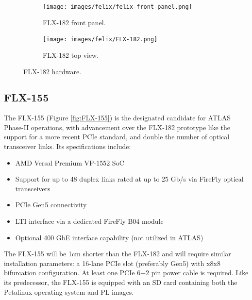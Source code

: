 \begin{figure}[H]
\centering
\begin{subfigure}[b]{0.48\textwidth}
    \centering
    \texttt{[image: images/felix/felix-front-panel.png]}
    \caption{FLX-182 front panel.}
    \label{fig:FLX-182-panel}
\end{subfigure}
\hfill
\begin{subfigure}[b]{0.48\textwidth}
    \centering
    \texttt{[image: images/felix/FLX-182.png]}
    \caption{FLX-182 top view.}
    \label{fig:FLX-182}
\end{subfigure}
\caption{FLX-182 hardware.}
\label{fig:FLX-182-combined}
\end{figure}

\subsection{FLX-155}
\label{subsec:FLX-155}
The FLX-155 (Figure \ref{fig:FLX-155}) is the designated candidate for \acs{ATLAS} Phase-II operations, with advancement over the FLX-182 prototype like the support for a more recent \acs{PCIe} standard, and double the number of optical transceiver links. Its specifications include:

\begin{itemize}
    \item AMD Versal Premium VP-1552 SoC
    \item Support for up to 48 duplex links rated at up to 25 Gb/s via FireFly optical transceivers
    \item \acs{PCIe} Gen5 connectivity
    \item \acs{LTI} interface via a dedicated FireFly B04 module
    \item Optional 400 GbE interface capability (not utilized in ATLAS)
\end{itemize}

The FLX-155 will be 1cm shorter than the FLX-182 and will require similar installation parameters: a 16-lane \acs{PCIe} slot (preferably Gen5) with x8x8 bifurcation configuration. At least one \acs{PCIe} 6+2 pin power cable is required. Like its predecessor, the FLX-155 is equipped with an SD card containing both the Petalinux operating system and \acl{PL} images.

